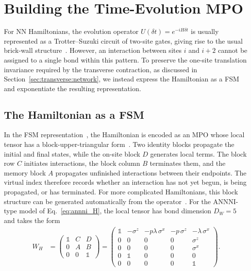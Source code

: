 \FloatBarrier
\section{Building the Time-Evolution MPO}
\label{sec:mporep}

For \ac{NN} Hamiltonians, the evolution operator $U(\delta t)=e^{-iH\delta t}$ is usually represented as a Trotter--Suzuki circuit of two-site gates, giving rise to the usual brick-wall structure~\cite{paeckel2019}. However, an interaction between sites $i$ and $i+2$ cannot be assigned to a single bond within this pattern. To preserve the one-site translation invariance required by the transverse contraction, as discussed in Section~\ref{sec:transverse:network}, we instead express the Hamiltonian as a \acf{FSM} and exponentiate the resulting representation.

\subsection{The Hamiltonian as a \texorpdfstring{\ac{FSM}}{FSM}}
\label{sec:mporep:fsm}

In the \ac{FSM} representation~\cite{crosswhite2008,pirvu2010}, the Hamiltonian is encoded as an \ac{MPO} whose local tensor has a block-upper-triangular form~\cite{parker2020}. Two identity blocks propagate the initial and final states, while the on-site block $D$ generates local terms. The block row $C$ initiates interactions, the block column $B$ terminates them, and the memory block $A$ propagates unfinished interactions between their endpoints. The virtual index therefore records whether an interaction has not yet begun, is being propagated, or has terminated. For more complicated Hamiltonians, this block structure can be generated automatically from the operator~\cite{hubig2017}. For the \ac{ANNNI}-type model of Eq.~\eqref{eq:annni_H}, the local tensor has bond dimension $D_W=5$ and takes the form
\begin{align}
  W_H & =
  \begin{pmatrix}
    \mathbb{1} & C & D          \\
    0          & A & B          \\
    0          & 0 & \mathbb{1}
  \end{pmatrix}=
  \begin{pmatrix}
    \mathbb{1} & -\sigma^z  & -p\lambda\,\sigma^x & -p\,\sigma^z & -\lambda\,\sigma^x \\
    0          & 0          & 0                   & 0            & \sigma^z           \\
    0          & 0          & 0                   & 0            & \sigma^x           \\
    0          & \mathbb{1} & 0                   & 0            & 0                  \\
    0          & 0          & 0                   & 0            & \mathbb{1}
  \end{pmatrix}.
  \label{eq:Wannni}
\end{align}

